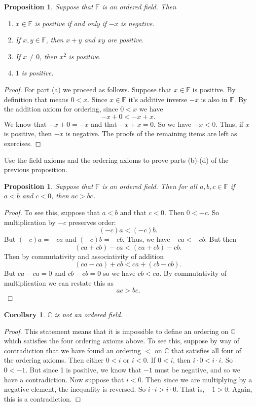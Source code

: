 \documentclass[11pt]{article}
\newenvironment{task}
	{\begin{mdframed}[linecolor=lightgray, linewidth=3pt]\raggedright}
	{\end{mdframed}}
\newtheorem{proposition}[theorem]{Proposition}
\newtheorem{corollary}[theorem]{Corollary}
\theoremstyle{definition}
\begin{document}
\begin{proposition}
  Suppose that $\mathbb{F}$ is an ordered field. Then
  \begin{enumerate}
    \item[(a)] $x\in \mathbb{F}$ is positive if and only if $-x$ is negative.
    \item[(b)] If $x,y \in \mathbb{F}$, then $x+y$ and $xy$ are positive.
    \item[(c)] If $x\neq 0$, then $x^2$ is positive.
    \item[(d)] $1$ is positive.
  \end{enumerate}
\end{proposition}
\begin{proof}
  For part (a) we proceed as follows. Suppose that $x\in\mathbb{F}$ is positive. By definition that means $0 < x$. Since $x\in\mathbb{F}$ it's additive
  inverse $-x$ is also in $\mathbb{F}$. By the addition axiom for ordering, since $0 < x$ we have
  \[ -x + 0 < -x + x.\]
  We know that $-x+0 = -x$ and that $-x + x = 0$. So we have $-x < 0$. Thus, if $x$ is positive, then $-x$ is negative. The proofs of the remaining items
  are left as exercises.
\end{proof}

\begin{task}
  Use the field axioms and the ordering axioms to prove parts (b)-(d) of the previous proposition.
\end{task}

\begin{proposition}
  Suppose that $\mathbb{F}$ is an ordered field. Then for all $a,b,c\in\mathbb{F}$ if $a< b$ and $c < 0$, then $ac > bc$.
\end{proposition}
\begin{proof}
  To see this, suppose that $a < b$ and that $c < 0$. Then $0 < -c$. So multiplication by $-c$ preserves order:
  \[ (-c)a < (-c)b.\]
  But $(-c)a = -ca$ and $(-c)b = -cb$. Thus, we have $-ca < -cb$. But then
  \[ (ca + cb) - ca < (ca + cb) -cb.\]
  Then by commutativity and associativity of addition
  \[ (ca - ca) + cb < ca + (cb -cb).\]
  But $ca - ca = 0$ and $cb - cb =0$ so we have $cb < ca$. By commutativity of multiplication we can restate this as
  \[ ac > bc. \]
\end{proof}


\begin{corollary}
  $\mathbb{C}$ is not an ordered field.
\end{corollary}
\begin{proof}
  This statement means that it is impossible to define an ordering on $\mathbb{C}$ which satisfies the four ordering axioms above. To see this, suppose
  by way of contradiction that we have found an ordering $<$ on $\mathbb{C}$ that satisfies all four of the ordering axioms. Then either $0< i$ or $i < 0$.
  If $0 < i$, then $i\cdot 0 < i\cdot i$. So $0 < -1$. But since 1 is positive, we know that $-1$ must be negative, and so we have a contradiction.
  Now suppose that $i < 0$. Then since we are multiplying by a negative element, the inequality is reversed. So $i\cdot i > i\cdot 0$. That is, 
  $-1 > 0$. Again, this is a contradiction.
\end{proof}
\end{document}
